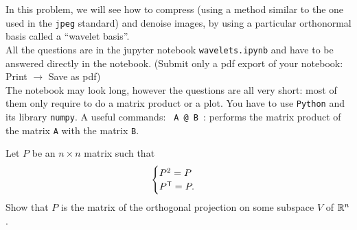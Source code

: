 \documentclass[11pt,nocut]{article}
\begin{document}
\begin{problem}[4 points]

	In this problem, we will see how to compress (using a method similar to the one used in the \texttt{jpeg} standard) and denoise images, by using a particular orthonormal basis called a ``wavelet basis''.
\\

All the questions are in the jupyter notebook \texttt{wavelets.ipynb} and have to be answered directly in the notebook. (Submit only a pdf export of your notebook: Print $\to$ Save as pdf)
\\

The notebook may look long, however the questions are all very short: most of them only require to do a matrix product or a plot.
You have to use \texttt{Python} and its library \texttt{numpy}. A useful commands:
\texttt{ A @ B }: performs the matrix product of the matrix \texttt{A} with the matrix \texttt{B}.


\end{problem}

\vspace{1mm}

\begin{problem}[$\star$]
	Let $P$ be an $n \times n$ matrix such that
	$$
	\begin{cases}
		P^2 = P \\
		P^{{\sf T}} = P.
	\end{cases}
	$$
	Show that $P$ is the matrix of the orthogonal projection on some subspace $V$ of $\mathbb{R}^n$.
\end{problem}
\vspace{1cm}
\centerline{}

%
%
\end{document}
